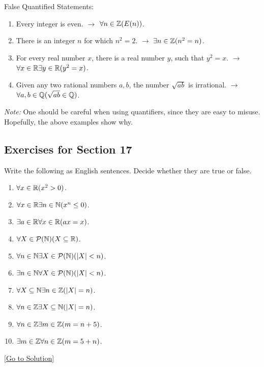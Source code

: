\begin{example}
    False Quantified Statements:
    \begin{enumerate}
        \item Every integer is even. $\rightarrow$ $\forall n\in\mathbb{Z}(E(n))$.
        \item There is an integer $n$ for which $n^{2}=2$. $\rightarrow$ $\exists n\in\mathbb{Z}(n^{2}=n)$.
        \item For every real number $x$, there is a real number $y$, such that $y^{2}=x$. $\rightarrow$ $\forall x\in\mathbb{R}\exists y\in\mathbb{R}(y^{2}=x)$.
        \item Given any two rational numbers $a,b$, the number $\sqrt{ab}$ is irrational. $\rightarrow$ $\forall a,b\in\mathbb{Q}(\sqrt{ab}\in\mathbb{Q})$.
    \end{enumerate}
\end{example}
\emph{Note:} One should be careful when using quantifiers, since they are easy to misuse. Hopefully, the above examples show why.

\subsection{Exercises for Section 17}
\begin{exercise}\label{ex:2.17.1}
    Write the following as English sentences. Decide whether they are true or false. 
    \begin{enumerate}
        \item $\forall x\in\mathbb{R}(x^{2}>0)$.
        \item $\forall x\in\mathbb{R}\exists n \in\mathbb{N}(x^{n}\le 0)$.
        \item $\exists a\in\mathbb{R}\forall x\in\mathbb{R}(ax=x)$.
        \item $\forall X\in\mathcal{P}(\mathbb{N})(X\subseteq\mathbb{R})$.
        \item $\forall n\in\mathbb{N}\exists X\in\mathcal{P}(\mathbb{N})(\lvert X \rvert<n)$.
        \item $\exists n\in\mathbb{N}\forall X\in\mathcal{P}(\mathbb{N})(\lvert X \rvert<n)$.
        \item $\forall X\subseteq\mathbb{N}\exists n\in\mathbb{Z}(\lvert X \rvert=n)$.
        \item $\forall n\in\mathbb{Z}\exists X\subseteq\mathbb{N}(\lvert X \rvert=n)$.
        \item $\forall n\in\mathbb{Z}\exists m\in\mathbb{Z}(m=n+5)$.
        \item $\exists m\in\mathbb{Z}\forall n\in\mathbb{Z}(m=5+n)$.
    \end{enumerate}
\end{exercise}\hyperref[sol:2.17.1]{[Go to Solution]}
